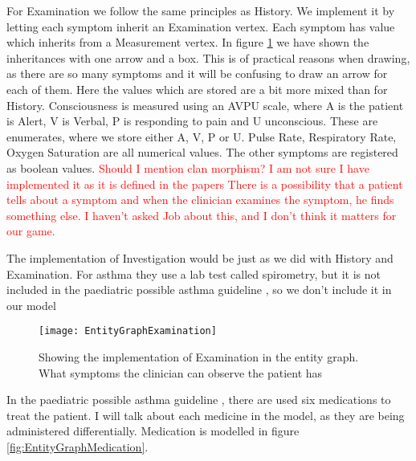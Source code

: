 For Examination we follow the same principles as History. We implement it by letting each symptom inherit an Examination vertex. Each symptom has value which inherits from a Measurement vertex. In figure \ref{fig:EntityGraphExamination} we have shown the inheritances with one arrow and a box. This is of practical reasons when drawing, as there are so many symptoms and it will be confusing to draw an arrow for each of them. Here the values which are stored are a bit more mixed than for History. Consciousness is measured using an AVPU scale, where A is the patient is Alert, V is Verbal, P is responding to pain and U unconscious. These are enumerates, where we store either A, V, P or U. Pulse Rate, Respiratory Rate, Oxygen Saturation are all numerical values. The other symptoms are registered as boolean values.
\textcolor{red}{Should I mention clan morphism? I am not sure I have implemented it as it is defined in the papers}
\textcolor{red}{There is a possibility that a patient tells about a symptom and when the clinician examines the symptom, he finds something else. I haven't asked Job about this, and I don't think it matters for our game.}

The implementation of Investigation would be just as we did with History and Examination. For asthma they use a lab test called spirometry, but it is not included in the paediatric possible asthma guideline \cite{RepublicofKeny2016}, so we don't include it in our model

\begin{figure}[h!]
	\caption {Showing the implementation of Examination in the entity graph. What symptoms the clinician can observe the patient has}
	\label{fig:EntityGraphExamination}
	\texttt{[image: EntityGraphExamination]}
\end{figure}

In the paediatric possible asthma guideline \cite{RepublicofKeny2016}, there are used six medications to treat the patient. I will talk about each medicine in the model, as they are being administered differentially. Medication is modelled in figure \ref{fig:EntityGraphMedication}.


